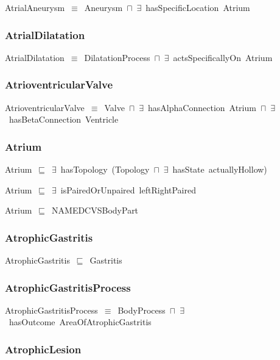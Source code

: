 \documentclass{article}
\begin{document}
AtrialAneurysm~\ensuremath{\equiv}~Aneurysm~\ensuremath{\sqcap}~\ensuremath{\exists}~hasSpecificLocation~Atrium

\subsubsection*{AtrialDilatation}

AtrialDilatation~\ensuremath{\equiv}~DilatationProcess~\ensuremath{\sqcap}~\ensuremath{\exists}~actsSpecificallyOn~Atrium

\subsubsection*{AtrioventricularValve}

AtrioventricularValve~\ensuremath{\equiv}~Valve~\ensuremath{\sqcap}~\ensuremath{\exists}~hasAlphaConnection~Atrium~\ensuremath{\sqcap}~\ensuremath{\exists}~hasBetaConnection~Ventricle

\subsubsection*{Atrium}

Atrium~\ensuremath{\sqsubseteq}~\ensuremath{\exists}~hasTopology~(Topology~\ensuremath{\sqcap}~\ensuremath{\exists}~hasState~actuallyHollow)~

Atrium~\ensuremath{\sqsubseteq}~\ensuremath{\exists}~isPairedOrUnpaired~leftRightPaired~

Atrium~\ensuremath{\sqsubseteq}~NAMEDCVSBodyPart~

\subsubsection*{AtrophicGastritis}

AtrophicGastritis~\ensuremath{\sqsubseteq}~Gastritis~

\subsubsection*{AtrophicGastritisProcess}

AtrophicGastritisProcess~\ensuremath{\equiv}~BodyProcess~\ensuremath{\sqcap}~\ensuremath{\exists}~hasOutcome~AreaOfAtrophicGastritis

\subsubsection*{AtrophicLesion}
\end{document}
